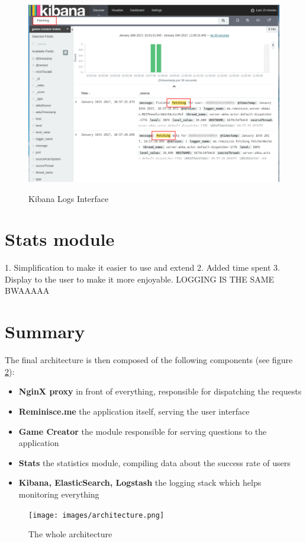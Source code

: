 \begin{figure}
\centering
{\includegraphics[width=6in]{images/kibana.png}}
\caption{Kibana Logs Interface}
\label{fig:kibana}
\end{figure}


\section{Stats module}

1. Simplification to make it easier to use and extend
2. Added time spent
3. Display to the user to make it more enjoyable.
LOGGING IS THE SAME BWAAAAA

\section{Summary}
The final architecture is then composed of the following components (see figure \ref{fig:architecture}):
\begin{itemize}
	\item \textbf{NginX proxy} in front of everything, responsible for dispatching the requests
	\item \textbf{Reminisce.me} the application itself, serving the user interface
	\item \textbf{Game Creator} the module responsible for serving questions to the application
	\item \textbf{Stats} the statistics module, compiling data about the success rate of users
	\item \textbf{Kibana, ElasticSearch, Logstash} the logging stack which helps monitoring everything
\end{itemize}
\begin{figure}
\centering
{\texttt{[image: images/architecture.png]}}
\caption{The whole architecture}
\label{fig:architecture}
\end{figure}